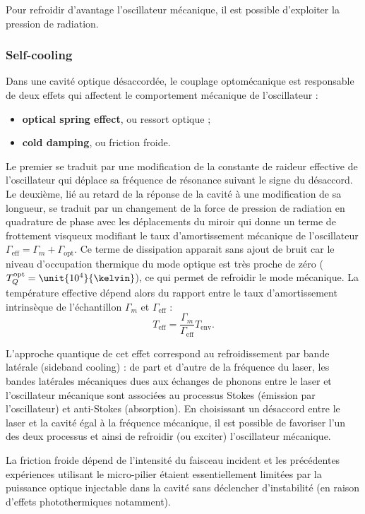 \documentclass[12pt,a4paper]{article}
\begin{document}
Pour refroidir d'avantage l'oscillateur mécanique, il est possible d'exploiter la pression de radiation.

\subsubsection{Self-cooling}

Dans une cavité optique désaccordée, le couplage optomécanique est responsable de deux effets qui affectent le comportement mécanique de l'oscillateur : 
\begin{itemize}
\item \textbf{optical spring effect}, ou ressort optique ;
\item \textbf{cold damping}, ou friction froide.
\end{itemize}
Le premier se traduit par une modification de la constante de raideur effective de l'oscillateur qui déplace sa fréquence de résonance suivant le signe du désaccord.
Le deuxième, lié au retard de la réponse de la cavité à une modification de sa longueur, se traduit par un changement de la force de pression de radiation en quadrature de phase avec les déplacements du miroir qui donne un terme de frottement visqueux modifiant le taux d'amortissement mécanique de l'oscillateur $\Gamma_\mathrm{eff} = \Gamma_m + \Gamma_\mathrm{opt}$.
Ce terme de dissipation apparait sans ajout de bruit car le niveau d'occupation thermique du mode optique est très proche de zéro ($T_Q^\mathrm{opt}=\unit{10^4}{\kelvin}$), ce qui permet de refroidir le mode mécanique.
La température effective dépend alors du rapport entre le taux d'amortissement intrinsèque de l'échantillon $\Gamma_m$ et $\Gamma_\mathrm{eff}$ :
\begin{equation}
T_\mathrm{eff} = \frac{\Gamma_m}{\Gamma_\mathrm{eff}} T_\mathrm{env}.
\end{equation}

L'approche quantique de cet effet correspond au refroidissement par bande latérale (sideband cooling) : de part et d'autre de la fréquence du laser, les bandes latérales mécaniques dues aux échanges de phonons entre le laser et l'oscillateur mécanique sont associées au processus Stokes (émission par l'oscillateur) et anti-Stokes (absorption).
En choisissant un désaccord entre le laser et la cavité égal à la fréquence mécanique, il est possible de favoriser l'un des deux processus et ainsi de refroidir (ou exciter) l'oscillateur mécanique. 

La friction froide dépend de l'intensité du faisceau incident et les précédentes expériences utilisant le micro-pilier étaient essentiellement limitées par la puissance optique injectable dans la cavité sans déclencher d'instabilité (en raison d'effets photothermiques notamment).
\end{document}
